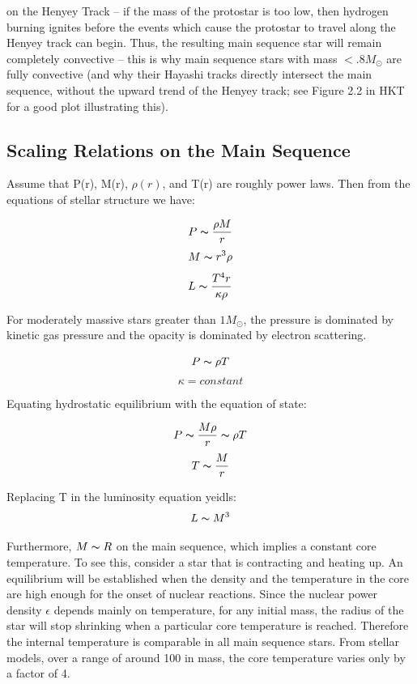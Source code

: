  on the Henyey Track -- if the mass of the protostar is too low, then hydrogen burning ignites before the events which cause the protostar to travel along the Henyey track can begin.  Thus, the resulting main sequence star will remain completely convective -- this is why main sequence stars with mass $< .8 M_{\odot}$ are fully convective (and why their Hayashi tracks directly intersect the main sequence, without the upward trend of the Henyey track; see Figure 2.2 in HKT for a good plot illustrating this).  

\subsection{Scaling Relations on the Main Sequence}
Assume that P(r), M(r), $\rho (r)$, and T(r) are roughly power laws.  Then from the equations of stellar structure we have:

\begin{equation}
P \thicksim \frac{\rho M}{r}
\end{equation}
\begin{equation}
M \thicksim r^3\rho
\end{equation}
\begin{equation}
L \thicksim \frac{T^4r}{\kappa \rho}
\end{equation}

For moderately massive stars greater than $1 M_\odot$, the pressure is dominated by kinetic gas pressure and the opacity is dominated by electron scattering.

\begin{equation}
P \thicksim \rho T
\end{equation}
\begin{equation}
\kappa = constant
\end{equation}

Equating hydrostatic equilibrium with the equation of state:

\begin{equation}
P \thicksim \frac{M\rho}{r} \thicksim \rho T
\end{equation}
\begin{equation}
T \thicksim \frac{M}{r}
\end{equation}

Replacing T in the luminosity equation yeidls:
\begin{equation}
L \thicksim M^3
\end{equation}

Furthermore, $M \thicksim R$ on the main sequence, which implies a constant core temperature.  To see this, consider a star that is contracting and heating up.  An equilibrium will be established when the density and the temperature in the core are high enough for the onset of nuclear reactions.  Since the nuclear power density $\epsilon$ depends mainly on temperature, for any initial mass, the radius of the star will stop shrinking when a particular core temperature is reached.  Therefore the internal temperature is comparable in all main sequence stars.  From stellar models, over a range of around 100 in mass, the core temperature varies only by a factor of 4.  

